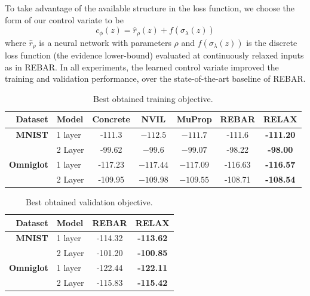 \documentclass{article}
\newcommand{\relaxed}{r}
\begin{document}
To take advantage of the available structure in the loss function, we choose the form of our control variate to be $$ c_\phi(z) = \hat{r}_\rho(z) + f(\sigma_\lambda(z))$$ where $\hat{r}_\rho$ is a neural network with parameters $\rho$ and $f(\sigma_\lambda(z))$ is the discrete loss function (the evidence lower-bound) evaluated at continuously relaxed inputs as in REBAR.  
%
In all experiments, the learned control variate improved the training and validation performance, over the state-of-the-art baseline of REBAR. 

\begin{table}[h]
\centering
\begin{tabular}{r l | c c c c c} 
Dataset & Model & Concrete & NVIL & MuProp  & REBAR & RELAX\\\midrule
\textbf{MNIST} & 1 layer  &-111.3 & $-112.5$ & $-111.7$  & -111.6 & \textbf{-111.20} \\ 
               & 2 Layer  &-99.62 & $-99.6$ & $-99.07$   & -98.22 & \textbf{-98.00} \\
\midrule
\textbf{Omniglot} & 1 layer &-117.23 & $-117.44$ & $-117.09$   & -116.63 & \textbf{-116.57} \\ 
                  & 2 Layer &-109.95 & $-109.98$ & $-109.55$  & -108.71 & \textbf{-108.54}
\end{tabular}
\caption{Best obtained training objective.}
\label{tab:vae tr}
\end{table}


\begin{table}[h]
\centering
\begin{tabular}{r l | c c} 
  Dataset & Model & REBAR & RELAX \\\midrule
\textbf{MNIST} & 1 layer  & -114.32 & \textbf{-113.62} \\ 
& 2 Layer  & -101.20 & \textbf{-100.85} \\ \midrule
\textbf{Omniglot} & 1 layer & -122.44 & \textbf{-122.11} \\ 
& 2 Layer & -115.83 & \textbf{-115.42}
\end{tabular}
\caption{Best obtained validation objective.}
\label{tab:vae val}
\end{table}
\end{document}
